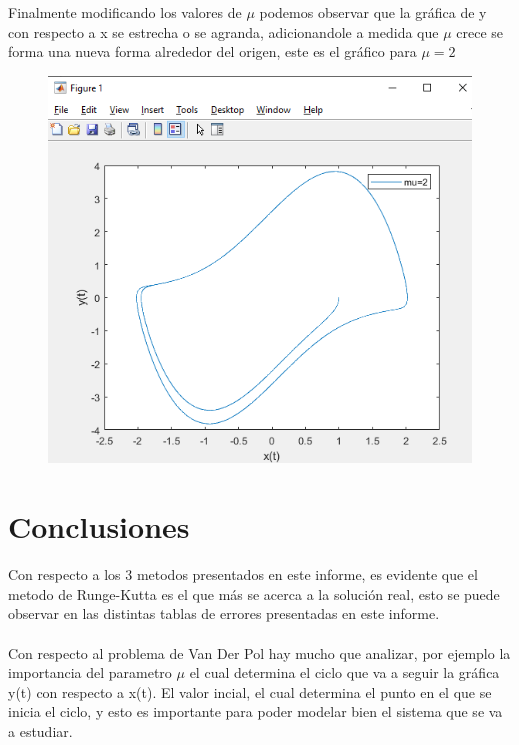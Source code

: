 \documentclass[12pt]{article}
\begin{document}
Finalmente modificando los valores de $\mu$ podemos observar que la gráfica de y con respecto a x se estrecha o se agranda, adicionandole a medida que $\mu$ crece se forma una nueva forma alrededor del origen, este es el gráfico para $\mu = 2$ 
\begin{figure}[h]
	\centering
	\caption{}
	\includegraphics[scale=0.45]{graf10.png}
	\label{graf10}
\end{figure}
\section{Conclusiones}
Con respecto a los 3 metodos presentados en este informe, es evidente que el metodo de Runge-Kutta es el que más se acerca a la solución real, esto se puede observar en las distintas tablas de errores presentadas en este informe.\\\\
Con respecto al problema de Van Der Pol hay mucho que analizar, por ejemplo la importancia del parametro $\mu$ el cual determina el ciclo que va a seguir la gráfica y(t) con respecto a x(t). El valor incial, el cual determina el punto en el que se inicia el ciclo, y esto es importante para poder modelar bien el sistema que se va a estudiar.
\end{document}
